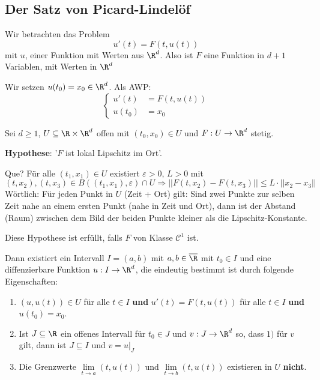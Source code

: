 \documentclass[main.tex]{subfiles}
\begin{document}
\subsection{Der Satz von Picard-Lindelöf}

Wir betrachten das Problem
$$u'(t) = F(t,u(t))$$
mit $u$, einer Funktion mit Werten aus $\R^d$. Also ist $F$ eine Funktion in $d+1$ Variablen, mit Werten in $\R^d$

Wir setzen $u(t_0) = x_0 \in \R^d$. Als AWP:
$$\left\{\begin{aligned}
  u'(t) & = F(t,u(t)) \\
  u(t_0) & = x_0
\end{aligned}\right.$$

\begin{Theorem}
  Sei $d \geq 1$, $U \subseteq \R \times \R^d$ offen mit $(t_0,x_0) \in U$ und $F: U \to \R^d$ stetig.

  \textbf{Hypothese}: '$F$ ist lokal Lipschitz im Ort'.

  Que? Für alle $(t_1,x_1) \in U$ existiert $\varepsilon > 0$, $L > 0$ mit
  $$(t,x_2) ,(t,x_3) \in B((t_1,x_1),\varepsilon) \cap U \Rightarrow ||F(t,x_2) - F(t,x_3)|| \leq L \cdot ||x_2 -x_3||$$
  Wörtlich: Für jeden Punkt in $U$ (Zeit + Ort) gilt: Sind zwei Punkte zur selben Zeit nahe an einem ersten Punkt (nahe in Zeit und Ort), dann ist der Abstand (Raum) zwischen dem Bild der beiden Punkte kleiner als die Lipschitz-Konstante.
  \begin{Bemerkung}
    Diese Hypothese ist erfüllt, falls $F$ von Klasse $\mathcal{C}^1$ ist.
  \end{Bemerkung}
  Dann existiert ein Intervall $I = (a,b)$ mit $a,b \in \overline{\R}$ mit $t_0 \in I$ und eine diffenzierbare Funktion $u: I \to \R^d$, die eindeutig bestimmt ist durch folgende Eigenschaften:
  \begin{enumerate}
    \item $(u,u(t)) \in U$ für alle $t \in I$ \textbf{und} $u'(t) = F(t,u(t))$ für alle $t \in I$ \textbf{und} $u(t_0) = x_0$.
    \item Ist $J \subseteq \R$ ein offenes Intervall für $t_0 \in J$ und $v: J \to \R^d$ so, dass $1)$ für $v$ gilt, dann ist $J \subseteq I$ und $v = u |_J$
    \item Die Grenzwerte $\lim \limits_{t \to a} (t,u(t))$ und $\lim \limits_{t \to b} (t,u(t))$ existieren in $U$ \textbf{nicht}.
  \end{enumerate}
\end{Theorem}
\end{document}
